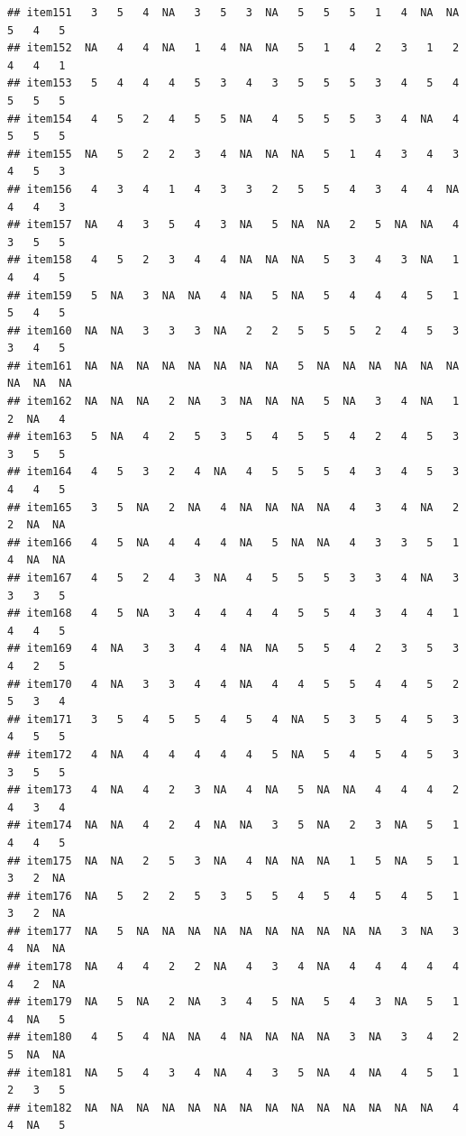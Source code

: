 \documentclass[
  man]{apa6}
\begin{document}
\begin{verbatim}
## item151   3   5   4  NA   3   5   3  NA   5   5   5   1   4  NA  NA   5   4   5
## item152  NA   4   4  NA   1   4  NA  NA   5   1   4   2   3   1   2   4   4   1
## item153   5   4   4   4   5   3   4   3   5   5   5   3   4   5   4   5   5   5
## item154   4   5   2   4   5   5  NA   4   5   5   5   3   4  NA   4   5   5   5
## item155  NA   5   2   2   3   4  NA  NA  NA   5   1   4   3   4   3   4   5   3
## item156   4   3   4   1   4   3   3   2   5   5   4   3   4   4  NA   4   4   3
## item157  NA   4   3   5   4   3  NA   5  NA  NA   2   5  NA  NA   4   3   5   5
## item158   4   5   2   3   4   4  NA  NA  NA   5   3   4   3  NA   1   4   4   5
## item159   5  NA   3  NA  NA   4  NA   5  NA   5   4   4   4   5   1   5   4   5
## item160  NA  NA   3   3   3  NA   2   2   5   5   5   2   4   5   3   3   4   5
## item161  NA  NA  NA  NA  NA  NA  NA  NA   5  NA  NA  NA  NA  NA  NA  NA  NA  NA
## item162  NA  NA  NA   2  NA   3  NA  NA  NA   5  NA   3   4  NA   1   2  NA   4
## item163   5  NA   4   2   5   3   5   4   5   5   4   2   4   5   3   3   5   5
## item164   4   5   3   2   4  NA   4   5   5   5   4   3   4   5   3   4   4   5
## item165   3   5  NA   2  NA   4  NA  NA  NA  NA   4   3   4  NA   2   2  NA  NA
## item166   4   5  NA   4   4   4  NA   5  NA  NA   4   3   3   5   1   4  NA  NA
## item167   4   5   2   4   3  NA   4   5   5   5   3   3   4  NA   3   3   3   5
## item168   4   5  NA   3   4   4   4   4   5   5   4   3   4   4   1   4   4   5
## item169   4  NA   3   3   4   4  NA  NA   5   5   4   2   3   5   3   4   2   5
## item170   4  NA   3   3   4   4  NA   4   4   5   5   4   4   5   2   5   3   4
## item171   3   5   4   5   5   4   5   4  NA   5   3   5   4   5   3   4   5   5
## item172   4  NA   4   4   4   4   4   5  NA   5   4   5   4   5   3   3   5   5
## item173   4  NA   4   2   3  NA   4  NA   5  NA  NA   4   4   4   2   4   3   4
## item174  NA  NA   4   2   4  NA  NA   3   5  NA   2   3  NA   5   1   4   4   5
## item175  NA  NA   2   5   3  NA   4  NA  NA  NA   1   5  NA   5   1   3   2  NA
## item176  NA   5   2   2   5   3   5   5   4   5   4   5   4   5   1   3   2  NA
## item177  NA   5  NA  NA  NA  NA  NA  NA  NA  NA  NA  NA   3  NA   3   4  NA  NA
## item178  NA   4   4   2   2  NA   4   3   4  NA   4   4   4   4   4   4   2  NA
## item179  NA   5  NA   2  NA   3   4   5  NA   5   4   3  NA   5   1   4  NA   5
## item180   4   5   4  NA  NA   4  NA  NA  NA  NA   3  NA   3   4   2   5  NA  NA
## item181  NA   5   4   3   4  NA   4   3   5  NA   4  NA   4   5   1   2   3   5
## item182  NA  NA  NA  NA  NA  NA  NA  NA  NA  NA  NA  NA  NA  NA   4   4  NA   5

\end{verbatim}
\end{document}
